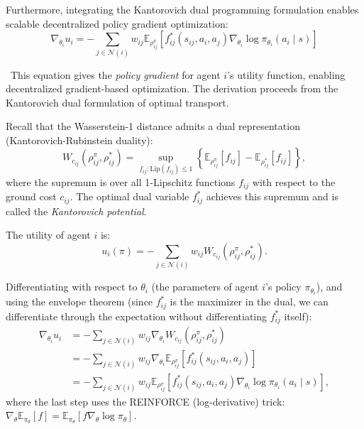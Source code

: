 \documentclass[12pt,a4paper,oneside]{report}
\theoremstyle{definition}
\theoremstyle{remark}
\begin{document}
\medskip
\noindent Furthermore, integrating the Kantorovich dual programming formulation enables scalable decentralized policy gradient optimization:
\begin{equation} \label{eq:policy_gradient}
\nabla_{\theta_i} u_i = - \sum_{j \in \mathcal{N}(i)} w_{ij} \mathbb{E}_{\rho^\pi_{ij}} \left[ f^*_{ij}(s_{ij}, a_i, a_j) \nabla_{\theta_i} \log \pi_{\theta_i}(a_i \mid s) \right]
\end{equation}

\medskip
\noindent\ This equation gives the \emph{policy gradient} for agent $i$'s utility function, enabling decentralized gradient-based optimization. The derivation proceeds from the Kantorovich dual formulation of optimal transport.

Recall that the Wasserstein-1 distance admits a dual representation (Kantorovich-Rubinstein duality):
\[
W_{c_{ij}}(\rho^\pi_{ij}, \rho^*_{ij}) = \sup_{f_{ij} : \text{Lip}(f_{ij}) \leq 1} \left\{\mathbb{E}_{\rho^\pi_{ij}}[f_{ij}] - \mathbb{E}_{\rho^*_{ij}}[f_{ij}]\right\},
\]
where the supremum is over all 1-Lipschitz functions $f_{ij}$ with respect to the ground cost $c_{ij}$. The optimal dual variable $f^*_{ij}$ achieves this supremum and is called the \emph{Kantorovich potential}.

The utility of agent $i$ is:
\[
u_i(\pi) = -\sum_{j \in \mathcal{N}(i)} w_{ij} W_{c_{ij}}(\rho^\pi_{ij}, \rho^*_{ij}).
\]

Differentiating with respect to $\theta_i$ (the parameters of agent $i$'s policy $\pi_{\theta_i}$), and using the envelope theorem (since $f^*_{ij}$ is the maximizer in the dual, we can differentiate through the expectation without differentiating $f^*_{ij}$ itself):
\begin{align*}
\nabla_{\theta_i} u_i &= -\sum_{j \in \mathcal{N}(i)} w_{ij} \nabla_{\theta_i} W_{c_{ij}}(\rho^\pi_{ij}, \rho^*_{ij}) \\
&= -\sum_{j \in \mathcal{N}(i)} w_{ij} \nabla_{\theta_i} \mathbb{E}_{\rho^\pi_{ij}}[f^*_{ij}(s_{ij}, a_i, a_j)] \\
&= -\sum_{j \in \mathcal{N}(i)} w_{ij} \mathbb{E}_{\rho^\pi_{ij}}\left[f^*_{ij}(s_{ij}, a_i, a_j) \nabla_{\theta_i} \log \pi_{\theta_i}(a_i \mid s)\right],
\end{align*}
where the last step uses the REINFORCE (log-derivative) trick: $\nabla_\theta \mathbb{E}_{\pi_\theta}[f] = \mathbb{E}_{\pi_\theta}[f \nabla_\theta \log \pi_\theta]$.
\end{document}
